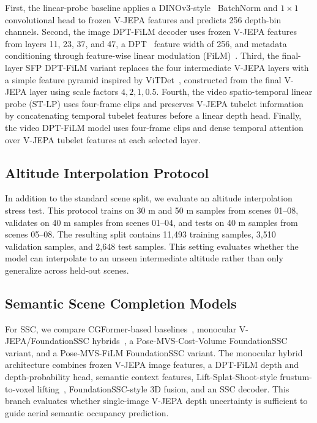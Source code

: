 First, the linear-probe baseline applies a DINOv3-style~\cite{simeoni2025dinov3} BatchNorm and $1\times1$ convolutional head to frozen V-JEPA features and predicts 256 depth-bin channels. 
Second, the image DPT-FiLM decoder uses frozen V-JEPA features from layers 11, 23, 37, and 47, a DPT~\cite{ranftl2021dpt} feature width of 256, and metadata conditioning through feature-wise linear modulation (FiLM)~\cite{perez2018film}. 
Third, the final-layer SFP DPT-FiLM variant replaces the four intermediate V-JEPA layers with a simple feature pyramid inspired by ViTDet~\cite{li2022vitdet}, constructed from the final V-JEPA layer using scale factors $4,2,1,0.5$. 
Fourth, the video spatio-temporal linear probe (ST-LP) uses four-frame clips and preserves V-JEPA tubelet information by concatenating temporal tubelet features before a linear depth head. 
Finally, the video DPT-FiLM model uses four-frame clips and dense temporal attention over V-JEPA tubelet features at each selected layer.

\subsection{Altitude Interpolation Protocol}
In addition to the standard scene split, we evaluate an altitude interpolation stress test. 
This protocol trains on 30 m and 50 m samples from scenes 01--08, validates on 40 m samples from scenes 01--04, and tests on 40 m samples from scenes 05--08. 
The resulting split contains 11,493 training samples, 3,510 validation samples, and 2,648 test samples. 
This setting evaluates whether the model can interpolate to an unseen intermediate altitude rather than only generalize across held-out scenes.

\subsection{Semantic Scene Completion Models}
For SSC, we compare CGFormer-based baselines~\cite{yu2024cgformer}, monocular V-JEPA/FoundationSSC hybrids~\cite{chen2025foundationssc}, a Pose-MVS-Cost-Volume FoundationSSC variant, and a Pose-MVS-FiLM FoundationSSC variant. 
The monocular hybrid architecture combines frozen V-JEPA image features, a DPT-FiLM depth and depth-probability head, semantic context features, Lift-Splat-Shoot-style frustum-to-voxel lifting~\cite{philion2020lss}, FoundationSSC-style 3D fusion, and an SSC decoder. 
This branch evaluates whether single-image V-JEPA depth uncertainty is sufficient to guide aerial semantic occupancy prediction.

